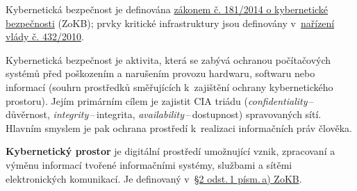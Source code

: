 
Kybernetická bezpečnost je definována \href{https://www.zakonyprolidi.cz/cs/2014-181}{zákonem č. 181/2014 o kybernetické bezpečnosti} (ZoKB); prvky kritické infrastruktury jsou definovány v~\href{https://www.zakonyprolidi.cz/cs/2010-432}{nařízení vlády č. 432/2010}.

Kybernetická bezpečnost je aktivita, která se zabývá ochranou počítačových systémů před poškozením a narušením provozu hardwaru, softwaru nebo informací (souhrn prostředků směřujících k~zajištění ochrany kybernetického prostoru). Jejím primárním cílem je zajistit CIA triádu (\emph{confidentiality}\,--\,důvěrnost, \emph{integrity}\,--\,integrita, \emph{availability}\,--\,dostupnost) spravovaných sítí. Hlavním smyslem je pak ochrana prostředí k~realizaci informačních práv člověka.

\textbf{Kybernetický prostor} je digitální prostředí umožnující vznik, zpracovaní a výměnu informací tvořené informačními systémy, službami a sítěmi elektronických komunikací. Je definovaný v~\href{https://www.zakonyprolidi.cz/cs/2014-181#p2-1-a}{§2 odst.\,1 písm.\,a) ZoKB}.

